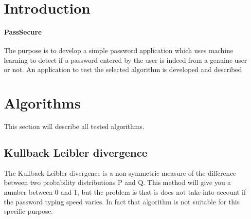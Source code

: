 \documentclass[fleqn,10pt]{SelfArx} %
\begin{document}
\flushbottom %

\maketitle %

\tableofcontents %

\thispagestyle{empty} %


\section*{Introduction} %


\paragraph{PassSecure}The purpose is to develop a simple password application which uses machine learning to detect if a password entered by the user is indeed from a genuine user or not. An application to test the selected algorithm is developed and described


\section{Algorithms}

This section will describe all tested algorithms.

\subsection{Kullback Leibler divergence}
The Kullback Leibler divergence is a non symmetric measure of the difference between two probability distributions P and Q.\cite{kullback} This method will give you a number between 0 and 1, but the problem is that is does not take into account if the password typing speed varies. In fact that algorithm is not suitable for this specific purpose.
\end{document}
